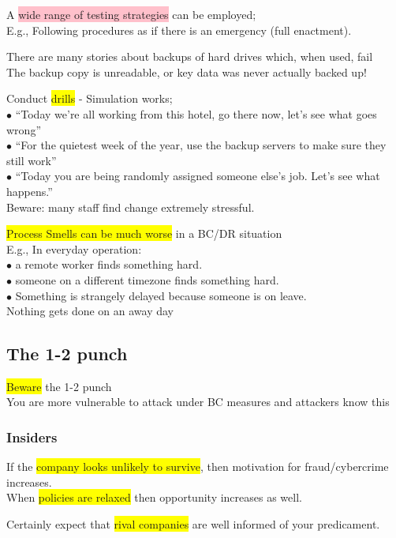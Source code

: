 \documentclass[tikz,border=10pt]{project_plan}
\newcommand{\bulletPoint}{\hspace{-3.1pt}$\bullet$ \hspace{5pt}}
\begin{document}
A \colorbox{pink}{wide range of testing strategies} can be employed;\\
E.g., Following procedures as if there is an emergency (full enactment).

There are many stories about backups of hard drives which, when used, fail \\
The backup copy is unreadable, or key data was never actually backed up!

Conduct \colorbox{yellow}{drills} - Simulation works;\\
\bulletPoint “Today we’re all working from this hotel, go there now, let’s see what goes wrong” \\
\bulletPoint “For the quietest week of the year, use the backup servers to make sure they still work” \\
\bulletPoint “Today you are being randomly assigned someone else’s job. Let’s see what happens.”\\
Beware: many staff find change extremely stressful.

\colorbox{yellow}{Process Smells can be much worse} in a BC/DR situation\\
E.g., In everyday operation:\\
\bulletPoint a remote worker finds something hard.\\
\bulletPoint someone on a different timezone finds something hard. \\
\bulletPoint Something is strangely delayed because someone is on leave.\\
Nothing gets done on an away day

\subsection{The 1-2 punch}

\colorbox{yellow}{Beware} the 1-2 punch\\
You are more vulnerable to attack under BC measures and attackers know this

\subsubsection{Insiders}

If the \colorbox{yellow}{company looks unlikely to survive}, then motivation for fraud/cybercrime increases.\\
When \colorbox{yellow}{policies are relaxed} then opportunity increases as well.

Certainly expect that \colorbox{yellow}{rival companies} are well informed of your predicament.
\end{document}
